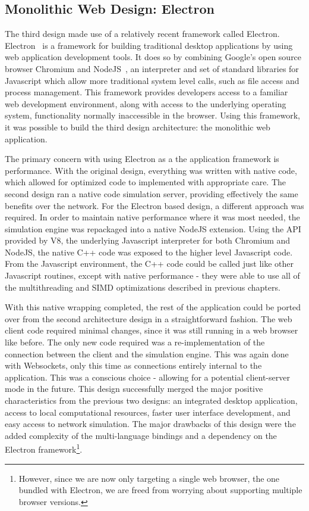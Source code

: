 \subsection{Monolithic Web Design: Electron}

 The third design made use of a relatively recent framework called
 Electron. Electron~\citep{Electron:2016} is a framework for building
 traditional desktop applications by using web application development
 tools. It does so by combining Google's open source browser Chromium
 and NodeJS~\citep{NodeJS:2017}, an interpreter and set of standard libraries for
 Javascript which allow more traditional system level calls, such as
 file access and process management. This framework provides
 developers access to a familiar web development environment, along
 with access to the underlying operating system, functionality
 normally inaccessible in the browser. Using this framework, it was
 possible to build the third design architecture: the monolithic web
 application.

 The primary concern with using Electron as a the application
 framework is performance. With the original design, everything was
 written with native code, which allowed for optimized code to
 implemented with appropriate care. The second design ran a native
 code simulation server, providing effectively the same benefits over
 the network. For the Electron based design, a different approach was
 required. In order to maintain native performance where it was most
 needed, the simulation engine was repackaged into a native NodeJS
 extension. Using the API provided by V8, the underlying Javascript
 interpreter for both Chromium and NodeJS, the native C++ code was
 exposed to the higher level Javascript code. From the Javascript
 environment, the C++ code could be called just like other Javascript
 routines, except with native performance - they were able to use all
 of the multithreading and SIMD optimizations described in previous
 chapters.

 With this native wrapping completed, the rest of the application
 could be ported over from the second architecture design in a
 straightforward fashion. The web client code required minimal
 changes, since it was still running in a web browser like before. The
 only new code required was a re-implementation of the connection
 between the client and the simulation engine. This was again done
 with Websockets, only this time as connections entirely internal to
 the application. This was a conscious choice - allowing for a
 potential client-server mode in the future. This design successfully
 merged the major positive characteristics from the previous two
 designs: an integrated desktop application, access to local
 computational resources, faster user interface development, and easy
 access to network simulation. The major drawbacks of this design were
 the added complexity of the multi-language bindings and a dependency
 on the Electron framework\footnote{However, since we are now only
   targeting a single web browser, the one bundled with Electron, we
   are freed from worrying about supporting multiple browser versions.}. 

